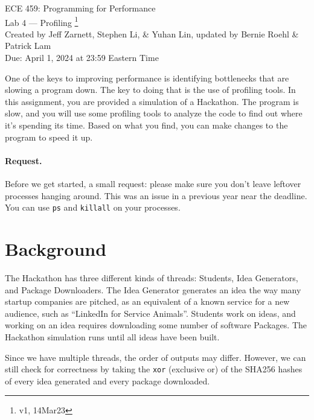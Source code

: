 



\begin{center}
{\Large ECE 459: Programming for Performance}\\
{\Large Lab 4 --- Profiling \footnote{v1, 14Mar23}}\\[1em]
{
Created by Jeff Zarnett, Stephen Li, \& Yuhan Lin, updated by Bernie Roehl \& Patrick Lam
}\\
Due: April 1, 2024 at 23:59 Eastern Time
\end{center}


One of the keys to improving performance is identifying bottlenecks that are slowing a program down. The key to doing that is the use of profiling tools. In this assignment, you are provided a simulation of a Hackathon. The program is slow,  and you will use some profiling tools to analyze the code to find out where it's spending its time. Based on what you find, you can make changes to the program to speed it up. 

\paragraph{Request.} Before we get started, a small request: please make sure you don't leave leftover processes hanging around. This was an issue in a previous year near the deadline. You can use \texttt{ps} and \texttt{killall} on your processes.

\section*{Background}


The Hackathon has three different kinds of threads: Students, Idea Generators, and Package Downloaders. The Idea Generator generates an idea the way many startup companies are pitched, as an equivalent of a known service for a new audience, such as ``LinkedIn for Service Animals''. Students work on ideas, and working on an idea requires downloading some number of software Packages. The Hackathon simulation runs until all ideas have been built. 


Since we have multiple threads, the order of outputs may differ. However, we can still check for correctness by taking the \texttt{xor} (exclusive or) of the SHA256 hashes of every idea generated and every package downloaded. 

